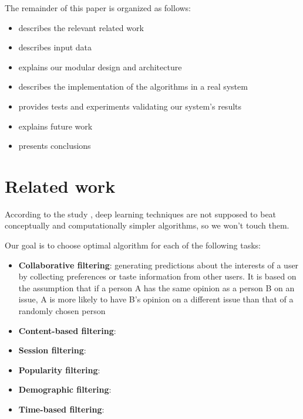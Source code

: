 \documentclass{article}
\begin{document}
    The remainder of this paper is organized as follows:
    
        \begin{itemize}
            \item {} describes the relevant related work
            \item {} describes input data
            \item {} explains our modular design and architecture
            \item {} describes the implementation of the algorithms in a real system
            \item {} provides tests and experiments validating
our system’s results
            \item {} explains future work
            \item {} presents conclusions
        \end{itemize}



\section{Related work}
\label{sec:related}

According to the study \citep{progress}, deep learning techniques are not supposed to beat conceptually and computationally simpler algorithms, so we won't touch them.

Our goal is to choose optimal algorithm for each of the following tasks:

\begin{itemize}
    \item \textbf{Collaborative filtering}: generating predictions about the interests of a user by collecting preferences or taste information from other users. It is based on the assumption that if a person A has the same opinion as a person B on an issue, A is more likely to have B's opinion on a different issue than that of a randomly chosen person
    \item \textbf{Content-based filtering}:
    \item \textbf{Session filtering}:
    \item \textbf{Popularity filtering}:
    \item \textbf{Demographic filtering}:
    \item \textbf{Time-based filtering}:
\end{itemize}
\end{document}
